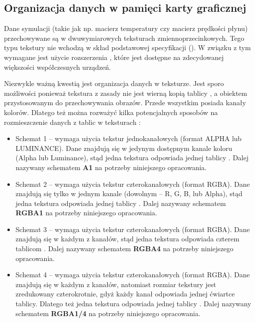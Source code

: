 \subsection{Organizacja danych w pamięci karty graficznej}
\label{sec:orgDanychWGPU}
Dane symulacji (takie jak np. macierz temperatury czy macierz prędkości płynu)
przechowywane są w dwuwymiarowych teksturach zmiennoprzecinkowych. Tego typu
tekstury nie wchodzą w skład podstawowej specyfikacji 
(\cite{WebGLSpec}). W związku z tym wymagane jest użycie rozszerzenia
, które jest dostępne na zdecydowanej większości
współczesnych urządzeń.

Niezwykle ważną kwestią jest organizacja danych w teksturze. Jest sporo
możliwości ponieważ tekstura z zasady nie jest wierną kopią tablicy
\js, a obiektem przystosowanym do przechowywania obrazów. Przede
wszystkim posiada kanały kolorów. Dlatego też można rozważyć kilka
potencjalnych sposobów na rozmieszczenie danych z tablic \js w teksturach
:

\begin{itemize}

\item Schemat 1 -- wymaga użycia tekstur jednokanałowych (format ALPHA lub
LUMINANCE). Dane znajdują się w jedynym dostępnym kanale koloru (Alpha lub
Luminance), stąd jedna tekstura odpowiada jednej tablicy \js. Dalej nazywany
schematem \textbf{A1} na potrzeby niniejszego opracowania.

\item Schemat 2 -- wymaga użycia tekstur czterokanałowych (format RGBA). Dane
znajdują się tylko w jednym kanale (dowolnym -- R, G, B, lub Alpha), stąd
jedna tekstura odpowiada jednej tablicy \js. Dalej nazywany schematem
\textbf{RGBA1} na potrzeby niniejszego opracowania.

\item Schemat 3 -- wymaga użycia tekstur czterokanałowych (format RGBA). Dane
znajdują się w każdym z kanałów, stąd jedna tekstura odpowiada czterem
tablicom \js. Dalej nazywany schematem \textbf{RGBA4} na potrzeby niniejszego
opracowania.

\item Schemat 4 -- wymaga użycia tekstur czterokanałowych (format RGBA). Dane
znajdują się w każdym z kanałów, natomiast rozmiar tekstury jest zredukowany
czterokrotnie, gdyż każdy kanał odpowiada jednej ćwiartce tablicy. Dlatego też
jedna tekstura odpowiada jednej tablicy \js. Dalej nazywany schematem
\textbf{RGBA1/4} na potrzeby niniejszego opracowania.

\end{itemize}

